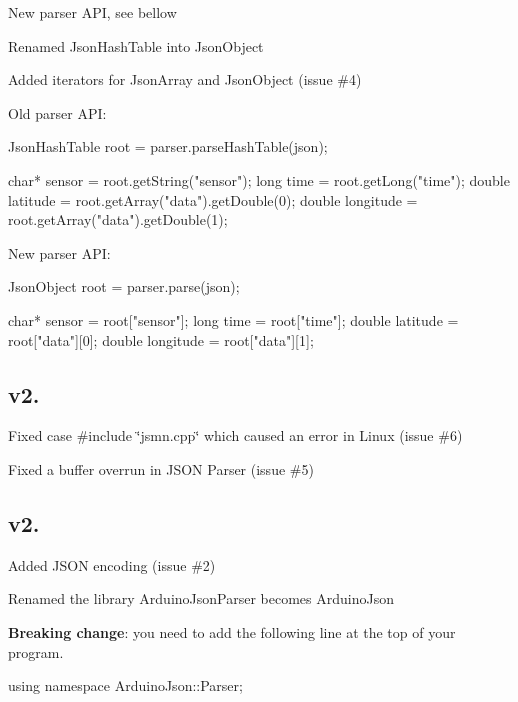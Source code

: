 \begin{DoxyItemize}
\item New parser A\+P\+I, see bellow
\item Renamed {\ttfamily Json\+Hash\+Table} into {\ttfamily Json\+Object}
\item Added iterators for {\ttfamily Json\+Array} and {\ttfamily Json\+Object} (issue \#4)
\end{DoxyItemize}

Old parser A\+P\+I\+: \begin{DoxyVerb}JsonHashTable root = parser.parseHashTable(json);

char*  sensor    = root.getString("sensor");
long   time      = root.getLong("time");
double latitude  = root.getArray("data").getDouble(0);
double longitude = root.getArray("data").getDouble(1);
\end{DoxyVerb}


New parser A\+P\+I\+: \begin{DoxyVerb}JsonObject root = parser.parse(json);

char*  sensor    = root["sensor"];
long   time      = root["time"];
double latitude  = root["data"][0];
double longitude = root["data"][1];
\end{DoxyVerb}


\subsection*{v2. }


\begin{DoxyItemize}
\item Fixed case {\ttfamily \#include \char`\"{}jsmn.\+cpp\char`\"{}} which caused an error in Linux (issue \#6)
\item Fixed a buffer overrun in J\+S\+O\+N Parser (issue \#5)
\end{DoxyItemize}

\subsection*{v2. }


\begin{DoxyItemize}
\item Added J\+S\+O\+N encoding (issue \#2)
\item Renamed the library {\ttfamily Arduino\+Json\+Parser} becomes {\ttfamily Arduino\+Json}
\end{DoxyItemize}

{\bfseries Breaking change}\+: you need to add the following line at the top of your program. \begin{DoxyVerb}using namespace ArduinoJson::Parser;
\end{DoxyVerb}



